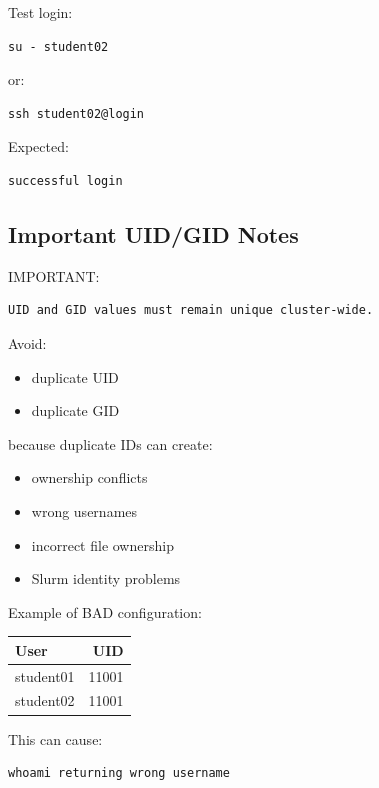 \documentclass[11pt]{article}
\begin{document}
Test login:

\begin{verbatim}
su - student02
\end{verbatim}

or:

\begin{verbatim}
ssh student02@login
\end{verbatim}

Expected:

\begin{verbatim}
successful login
\end{verbatim}
\subsection{Important UID/GID Notes}
\label{sec:orgfa1f31c}

IMPORTANT:

\begin{verbatim}
UID and GID values must remain unique cluster-wide.
\end{verbatim}

Avoid:
\begin{itemize}
\item duplicate UID
\item duplicate GID
\end{itemize}

because duplicate IDs can create:

\begin{itemize}
\item ownership conflicts
\item wrong usernames
\item incorrect file ownership
\item Slurm identity problems
\end{itemize}

Example of BAD configuration:

\begin{center}
\begin{tabular}{lr}
User & UID\\
\hline
student01 & 11001\\
student02 & 11001\\
\end{tabular}
\end{center}

This can cause:

\begin{verbatim}
whoami returning wrong username
\end{verbatim}
\end{document}
